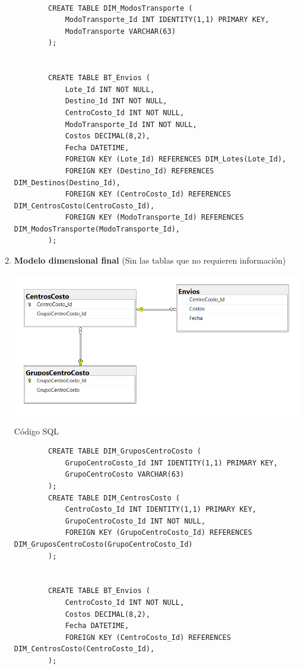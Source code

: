 \documentclass[12pt,letterpaper]{article}
\newcommand\tab[1][1cm]{\hspace*{#1}}
\begin{document}
\begin{enumerate}[\tab a.]
\begin{verbatim}
    
        CREATE TABLE DIM_ModosTransporte (
            ModoTransporte_Id INT IDENTITY(1,1) PRIMARY KEY,
            ModoTransporte VARCHAR(63)
        );
    
    
        CREATE TABLE BT_Envios (
            Lote_Id INT NOT NULL,
            Destino_Id INT NOT NULL,
            CentroCosto_Id INT NOT NULL,
            ModoTransporte_Id INT NOT NULL,
            Costos DECIMAL(8,2),
            Fecha DATETIME,
            FOREIGN KEY (Lote_Id) REFERENCES DIM_Lotes(Lote_Id),
            FOREIGN KEY (Destino_Id) REFERENCES DIM_Destinos(Destino_Id),
            FOREIGN KEY (CentroCosto_Id) REFERENCES DIM_CentrosCosto(CentroCosto_Id),
            FOREIGN KEY (ModoTransporte_Id) REFERENCES DIM_ModosTransporte(ModoTransporte_Id),
        );
    \end{verbatim}

    \item \textbf{Modelo dimensional final} (Sin las tablas que no requieren información)
    \begin{center}
        \includegraphics[width=13cm]{./img/img5.png}
    \end{center}
    \subitem Código SQL
    \begin{verbatim}
        CREATE TABLE DIM_GruposCentroCosto (
            GrupoCentroCosto_Id INT IDENTITY(1,1) PRIMARY KEY,
            GrupoCentroCosto VARCHAR(63)
        );
        CREATE TABLE DIM_CentrosCosto (
            CentroCosto_Id INT IDENTITY(1,1) PRIMARY KEY,
            GrupoCentroCosto_Id INT NOT NULL,
            FOREIGN KEY (GrupoCentroCosto_Id) REFERENCES DIM_GruposCentroCosto(GrupoCentroCosto_Id)
        );
    
    
        CREATE TABLE BT_Envios (
            CentroCosto_Id INT NOT NULL,
            Costos DECIMAL(8,2),
            Fecha DATETIME,
            FOREIGN KEY (CentroCosto_Id) REFERENCES DIM_CentrosCosto(CentroCosto_Id),
        );    
    \end{verbatim}
\end{enumerate}
\end{document}
